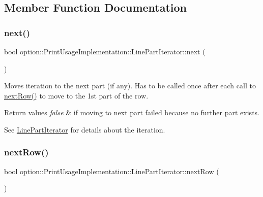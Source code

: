 \subsection{Member Function Documentation}
\mbox{\label{classoption_1_1PrintUsageImplementation_1_1LinePartIterator_a58b8743da57de2d108472eee60324df6}} 
\subsubsection{\texorpdfstring{next()}{next()}}
{\footnotesize\ttfamily bool option\+::\+Print\+Usage\+Implementation\+::\+Line\+Part\+Iterator\+::next (\begin{DoxyParamCaption}{ }\end{DoxyParamCaption})\hspace{0.3cm}{\ttfamily [inline]}}



Moves iteration to the next part (if any). Has to be called once after each call to \hyperlink{classoption_1_1PrintUsageImplementation_1_1LinePartIterator_a55d5c3e50f9c1d8cd48f518899a5a48c}{next\+Row()} to move to the 1st part of the row. 


\begin{DoxyRetVals}{Return values}
{\em false} & if moving to next part failed because no further part exists.\\
\hline
\end{DoxyRetVals}
See \hyperlink{classoption_1_1PrintUsageImplementation_1_1LinePartIterator}{Line\+Part\+Iterator} for details about the iteration. \mbox{\label{classoption_1_1PrintUsageImplementation_1_1LinePartIterator_a55d5c3e50f9c1d8cd48f518899a5a48c}} 
\subsubsection{\texorpdfstring{next\+Row()}{nextRow()}}
{\footnotesize\ttfamily bool option\+::\+Print\+Usage\+Implementation\+::\+Line\+Part\+Iterator\+::next\+Row (\begin{DoxyParamCaption}{ }\end{DoxyParamCaption})\hspace{0.3cm}{\ttfamily [inline]}}



